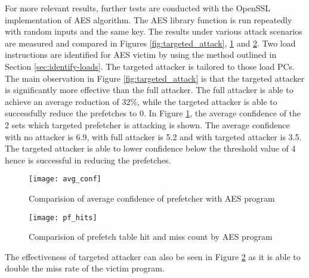For more relevant results, further tests are conducted with the OpenSSL
implementation of AES algorithm. The AES library function is run repeatedly
with random inputs and the same key. The results under various attack
scenarios are measured and compared in Figures \ref{fig:targeted_attack},
\ref{fig:targeted_avgconf} and \ref{fig:targeted_hitrate}.
Two load instructions are identified for AES victim by using the method outlined
in Section \ref{sec:identify-loads}. The targeted attacker is tailored to those load PCs.
The main observation in Figure \ref{fig:targeted_attack} is that the targeted attacker
is significantly more effective than the full attacker. The full attacker is
able to achieve an average reduction of 32\%, while the targeted attacker is able
to successfully reduce the prefetches to 0.
In Figure \ref{fig:targeted_avgconf}, the average confidence of the 2 sets which targeted
prefetcher is attacking is shown. The average confidence with no attacker is 6.9,
with full attacker is 5.2 and with targeted attacker is 3.5. The targeted attacker
is able to lower confidence below the threshold value of 4 hence is successful
in reducing the prefetches.

\begin{figure}[htbp]
    \centering
    \texttt{[image: avg\_conf]}
    \caption{Comparision of average confidence of prefetcher with AES program}
    \label{fig:targeted_avgconf}
\end{figure}

\begin{figure}[htbp]
    \centering
    \texttt{[image: pf\_hits]}
    \caption{Comparision of prefetch table hit and miss count by AES program}
    \label{fig:targeted_hitrate}
\end{figure}

The effectiveness of targeted attacker can also be seen in Figure \ref{fig:targeted_hitrate}
as it is able to double the miss rate of the victim program.

